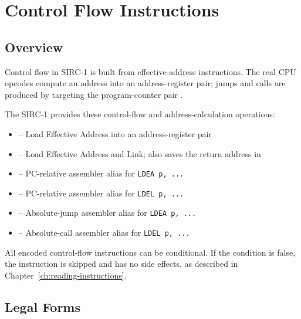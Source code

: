 \chapter{Control Flow Instructions}
\label{ch:control-flow}

\section{Overview}

Control flow in SIRC-1 is built from effective-address instructions. The real CPU opcodes compute an address into an
address-register pair; jumps and calls are produced by targeting the program-counter pair .

The SIRC-1 provides these control-flow and address-calculation operations:

\begin{itemize}
	\item {} -- Load Effective Address into an address-register pair
	\item {} -- Load Effective Address and Link; also saves the return address in 
	\item {} -- PC-relative assembler alias for \texttt{LDEA p, ...}
	\item {} -- PC-relative assembler alias for \texttt{LDEL p, ...}
	\item {} -- Absolute-jump assembler alias for \texttt{LDEA p, ...}
	\item {} -- Absolute-call assembler alias for \texttt{LDEL p, ...}
\end{itemize}

All encoded control-flow instructions can be conditional. If the condition is false, the instruction is skipped and has
no side effects, as described in Chapter~\ref{ch:reading-instructions}.

\section{Legal Forms}

